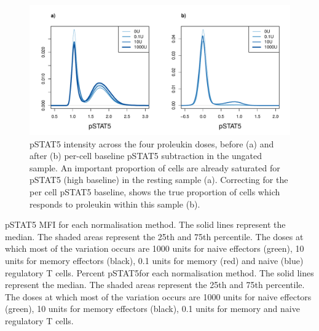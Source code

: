 \begin{figure}[h]
\centering
\includegraphics[scale=.5]{IL2/figures/pstat5-baseline-relative.pdf}
{ pSTAT5 intensity across the four proleukin doses, before (a) and after (b) per-cell baseline pSTAT5 subtraction in the ungated sample.}
{
  An important proportion of cells are already saturated for pSTAT5 (high baseline) in the resting sample (a).
  Correcting for the per cell pSTAT5 baseline, shows the true proportion of cells which responds to proleukin within this sample (b).
}
\end{figure}
{ pSTAT5 MFI for each normalisation method.  }
{
  The solid lines represent the median.
  The shaded areas represent the 25th and 75th percentile.
  The doses at which most of the variation occurs are 1000 units for naive effectors (green),
  10 units for memory effectors (black), 0.1 units for memory (red) and naive (blue) regulatory T cells.
}
{ Percent pSTAT5\positive for each normalisation method. }
{
  The solid lines represent the median.
  The shaded areas represent the 25th and 75th percentile.
  The doses at which most of the variation occurs are 1000 units for naive effectors (green),
  10 units for memory effectors (black), 0.1 units for memory and naive regulatory T cells.
}


